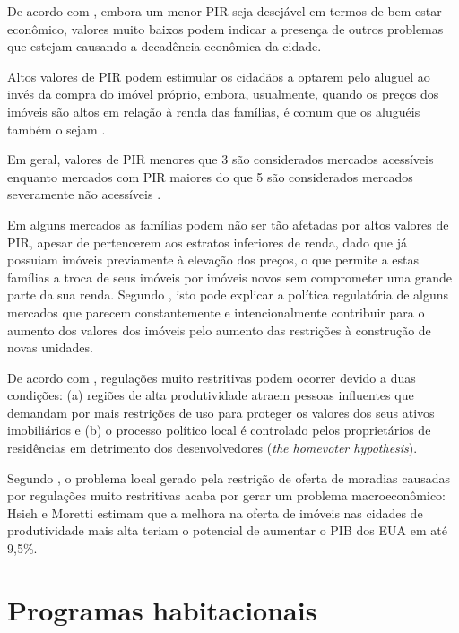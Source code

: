 \documentclass[
	12pt,				%
	oneside,			%
	a4paper,			%
	chapter=TITLE,		%
	section=TITLE,		%
	english,			%
	brazil				%
	]{abntex2}
\begin{document}
\begin{refsection}
De acordo com \textcite[p.~225]{bertaud}, embora um menor \gls{PIR} seja desejável em
termos de bem-estar econômico, valores muito baixos podem indicar a presença de
outros problemas que estejam causando a decadência econômica da cidade.

Altos valores de \gls{PIR} podem estimular os cidadãos a optarem pelo aluguel ao
invés da compra do imóvel próprio, embora, usualmente, quando os preços dos
imóveis são altos em relação à renda das famílias, é comum que os aluguéis
também o sejam \autocite[p.~227]{bertaud}.

Em geral, valores de \gls{PIR} menores que 3 são considerados mercados
acessíveis enquanto mercados com \gls{PIR} maiores do que 5 são
considerados mercados severamente não acessíveis \autocite[p.~225]{bertaud}.

Em alguns mercados as famílias podem não ser tão afetadas por altos valores de
\gls{PIR}, apesar de pertencerem aos estratos inferiores de renda, dado que já
possuiam imóveis previamente à elevação dos preços, o que permite a estas
famílias a troca de seus imóveis por imóveis novos sem comprometer uma grande
parte da sua renda. Segundo \textcite[p.~227]{bertaud}, isto pode explicar a política
regulatória de alguns mercados que parecem constantemente e intencionalmente
contribuir para o aumento dos valores dos imóveis pelo aumento das restrições
à construção de novas unidades.

De acordo com \textcite[p.~317]{fischel2015}, regulações muito restritivas podem ocorrer
devido a duas condições: (a) regiões de alta produtividade atraem pessoas
influentes que demandam por mais restrições de uso para proteger os valores dos
seus ativos imobiliários e (b) o processo político local é controlado pelos
proprietários de residências em detrimento dos desenvolvedores (\emph{the homevoter
hypothesis}).

Segundo \textcite{hsieh}, o problema local gerado pela restrição de oferta de moradias
causadas por regulações muito restritivas acaba por gerar um problema
macroeconômico: Hsieh e Moretti estimam que a melhora na oferta de imóveis nas
cidades de produtividade mais alta teriam o potencial de aumentar o \gls{PIB}
dos \gls{EUA} em até 9,5\%.

\hypertarget{programas-habitacionais}{%
\section{Programas habitacionais}\label{programas-habitacionais}}


\end{refsection}
\end{document}
